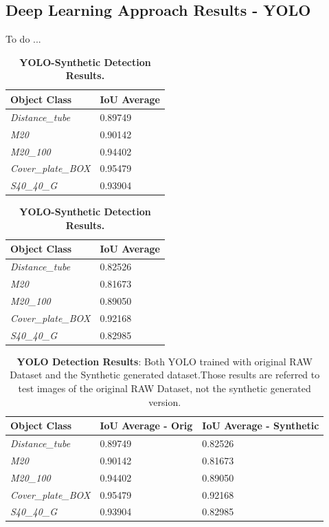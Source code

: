 \subsection{Deep Learning Approach Results - YOLO}\label{subsec:yolo_obj_det_results}
To do ...

\begin{table}[!hbt]
\parbox{.45\linewidth}{
	\centering
    \begin{tabular}{| l | l |}
    \hline
    \textbf{Object Class} & \textbf{IoU Average} \\ \hline
    \emph{Distance\_tube} & 0.89749 \\
    \emph{M20} & 0.90142 \\
    \emph{M20\_100} & 0.94402 \\
    \emph{Cover\_plate\_BOX} & 0.95479 \\
    \emph{S40\_40\_G} & 0.93904 \\
    \hline
    \end{tabular}
    \caption{\textbf{YOLO-Original Detection Results.}}
    \label{tab:dl_normal_results_per_class}
}
\hfill
\parbox{.45\linewidth}{
	\centering
    \begin{tabular}{| l | l |}
    \hline
    \textbf{Object Class} & \textbf{IoU Average} \\ \hline
    \emph{Distance\_tube} & 0.82526 \\
    \emph{M20} & 0.81673 \\
    \emph{M20\_100} & 0.89050 \\
    \emph{Cover\_plate\_BOX} & 0.92168 \\
    \emph{S40\_40\_G} & 0.82985 \\
    \hline
    \end{tabular}
    \caption{\textbf{YOLO-Synthetic Detection Results.}}
    \label{tab:dl_synthetic_results_per_class}
}
\end{table}

\begin{table}[!hbt]
	\centering
    \begin{tabular}{| l | l | l |}
    \hline
    \textbf{Object Class} & \textbf{IoU Average - Orig} & \textbf{IoU Average - Synthetic}\\ \hline
    \emph{Distance\_tube} & 0.89749 & 0.82526 \\
    \emph{M20} & 0.90142 & 0.81673 \\
    \emph{M20\_100} & 0.94402 & 0.89050 \\
    \emph{Cover\_plate\_BOX} & 0.95479 & 0.92168 \\
    \emph{S40\_40\_G} & 0.93904 & 0.82985 \\
    \hline
    \end{tabular}
    \caption{\textbf{YOLO Detection Results}: Both YOLO trained with original RAW Dataset and the Synthetic generated dataset.Those results are referred to test images of the original RAW Dataset, not the synthetic generated version.}
    \label{tab:dl_YOLO_results_unified}
\end{table}

